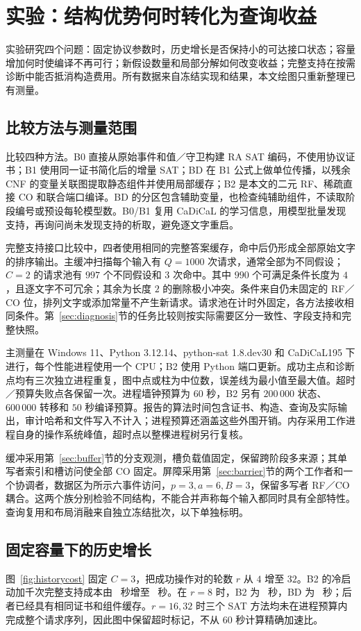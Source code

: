 \section{实验：结构优势何时转化为查询收益}\label{sec:evaluation}
实验研究四个问题：固定协议参数时，历史增长是否保持小的可达接口状态；容量增加何时使编译不再可行；新假设数量和局部分解如何改变收益；完整支持在按需诊断中能否抵消构造费用。所有数据来自冻结实现和结果，本文绘图只重新整理已有测量。

\subsection{比较方法与测量范围}
比较四种方法。B0 直接从原始事件和值／守卫构建 RA SAT 编码，不使用协议证书；B1 使用同一证书简化后的增量 SAT；BD 在 B1 公式上做单位传播，以残余 CNF 的变量关联图提取静态组件并使用局部缓存；B2 是本文的二元 RF、稀疏直接 CO 和联合端口编译。BD 的分区包含辅助变量，也检查纯辅助组件，不读取阶段编号或预设每轮模型数。B0/B1 复用 CaDiCaL 的学习信息，用模型批量发现支持，再询问尚未发现支持的析取，避免逐文字重启。

完整支持接口比较中，四者使用相同的完整答案缓存，命中后仍形成全部原始文字的排序输出。主缓冲扫描每个输入有 $Q=1000$ 次请求，通常全部为不同假设；$C=2$ 的请求池有 $997$ 个不同假设和 $3$ 次命中。其中 $990$ 个可满足条件长度为 $4$，且逐文字不可冗余；其余为长度 $2$ 的删除极小冲突。条件来自仍未固定的 RF／CO 位，排列文字或添加常量不产生新请求。请求池在计时外固定，各方法接收相同条件。第~\ref{sec:diagnosis}节的任务比较则按实际需要区分一致性、字段支持和完整快照。

主测量在 Windows 11、Python 3.12.14、python-sat 1.8.dev30 和 CaDiCaL195 下进行，每个性能进程使用一个 CPU；B2 使用 Python 端口更新。成功主点和诊断点均有三次独立进程重复，图中点或柱为中位数，误差线为最小值至最大值。超时／预算失败点各保留一次。进程墙钟预算为 $60$ 秒，B2 另有 $200\,000$ 状态、$600\,000$ 转移和 $50$ 秒编译预算。报告的算法时间包含证书、构造、查询及实际输出，审计哈希和文件写入不计入；进程预算还涵盖这些外围开销。内存采用工作进程自身的操作系统峰值，超时点以整棵进程树另行复核。

缓冲采用第~\ref{sec:buffer}节的分支观测，槽负载值固定，保留跨阶段多来源；其单写者索引和槽访问使全部 CO 固定。屏障采用第~\ref{sec:barrier}节的两个工作者和一个协调者，数据区为所示六事件访问，$p=3,a=6,B=3$，保留多写者 RF／CO 耦合。这两个族分别检验不同结构，不能合并声称每个输入都同时具有全部特性。查询复用和布局消融来自独立冻结批次，以下单独标明。

\subsection{固定容量下的历史增长}\label{sec:historyexp}
图~\ref{fig:historycost} 固定 $C=3$，把成功操作对的轮数 $r$ 从 $4$ 增至 $32$。B2 的冷启动加千次完整支持成本由 \HistoryFour\ 秒增至 \HistoryThirtyTwo\ 秒。在 $r=8$ 时，B2 为 \BufferEightBTwo\ 秒，BD 为 \BufferEightBD\ 秒；后者已经具有相同证书和组件缓存。$r=16,32$ 时三个 SAT 方法均未在进程预算内完成整个请求序列，因此图中保留超时标记，不从 $60$ 秒计算精确加速比。

